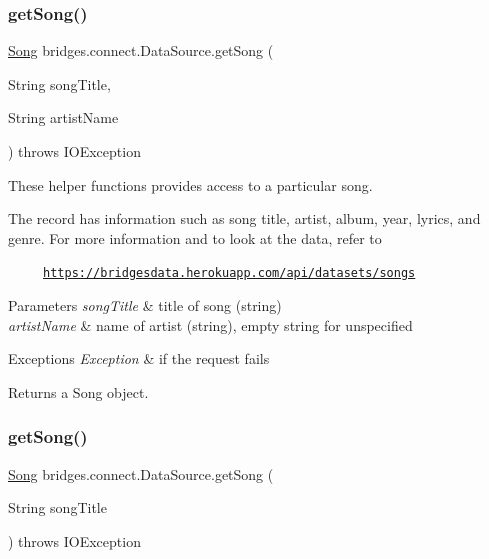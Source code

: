 \subsubsection{\texorpdfstring{get\+Song()}{getSong()}\hspace{0.1cm}{\footnotesize\ttfamily [1/2]}}
{\footnotesize\ttfamily \hyperlink{classbridges_1_1data__src__dependent_1_1_song}{Song} bridges.\+connect.\+Data\+Source.\+get\+Song (\begin{DoxyParamCaption}\item[{String}]{song\+Title,  }\item[{String}]{artist\+Name }\end{DoxyParamCaption}) throws I\+O\+Exception}

These helper functions provides access to a particular song.

The record has information such as song title, artist, album, year, lyrics, and genre. For more information and to look at the data, refer to 

~~~~~\href{https://bridgesdata.herokuapp.com/api/datasets/songs}{\tt https\+://bridgesdata.\+herokuapp.\+com/api/datasets/songs} 


\begin{DoxyParams}{Parameters}
{\em song\+Title} & title of song (string) \\
\hline
{\em artist\+Name} & name of artist (string), empty string for unspecified \\
\hline
\end{DoxyParams}

\begin{DoxyExceptions}{Exceptions}
{\em Exception} & if the request fails\\
\hline
\end{DoxyExceptions}
\begin{DoxyReturn}{Returns}
a Song object. 
\end{DoxyReturn}
\mbox{\label{classbridges_1_1connect_1_1_data_source_a4f49b088703c74d68bd854d40edc5ad4}} 
\subsubsection{\texorpdfstring{get\+Song()}{getSong()}\hspace{0.1cm}{\footnotesize\ttfamily [2/2]}}
{\footnotesize\ttfamily \hyperlink{classbridges_1_1data__src__dependent_1_1_song}{Song} bridges.\+connect.\+Data\+Source.\+get\+Song (\begin{DoxyParamCaption}\item[{String}]{song\+Title }\end{DoxyParamCaption}) throws I\+O\+Exception}

